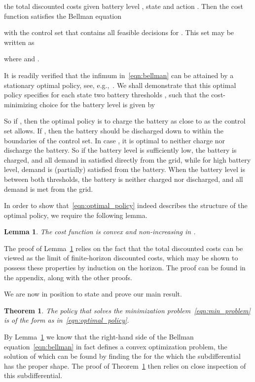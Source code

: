 \documentclass[journal]{IEEEtran}
\newcommand\1{\mathbf{1}}
\newtheorem{lemma}{Lemma}
\newtheorem{theorem}{Theorem}
\begin{document}
the total discounted costs given battery level , state  and action . Then the cost function satisfies the Bellman equation

with  the control set that contains all feasible decisions for . This set may be written as

where  and .

It is readily verified that the infimum in~\eqref{eqn:bellman} can be attained by a stationary optimal policy, see, e.g.,~\cite[Proposition 4.4]{BS96}. We shall demonstrate that this optimal policy specifies for each state  two battery thresholds ,  such that the cost-minimizing choice for the battery level  is given by

So if , then the optimal policy is to charge the battery as close to  as the control set allows. If , then the battery should be discharged down to  within the boundaries of the control set. In case , it is optimal to neither charge nor discharge the battery. So if the battery level is sufficiently low, the battery is charged, and all demand in satisfied directly from the grid, while for high battery level, demand is (partially) satisfied from the battery. When the battery level is between both thresholds, the battery is neither charged nor discharged, and all demand is met from the grid.

In order to show that~\eqref{eqn:optimal_policy} indeed describes the structure of the optimal policy, we require the following lemma.

\begin{lemma}\label{lem:cost_properties}
The cost function  is convex and non-increasing in .
\end{lemma}

The proof of Lemma~\ref{lem:cost_properties} relies on the fact that the total discounted costs can be viewed as the limit of finite-horizon discounted costs, which may be shown to possess these properties by induction on the horizon. The proof can be found in the appendix, along with the other proofs.


We are now in position to state and prove our main result.
\begin{theorem}\label{thm:optimal}
The policy that solves the minimization problem~\eqref{eqn:min_problem} is of the form   as in~\eqref{eqn:optimal_policy}.
\end{theorem}

By Lemma~\ref{lem:cost_properties} we know that the right-hand side of the Bellman equation~\eqref{eqn:bellman} in fact defines a convex optimization problem, the solution of which can be found by finding the  for the which the subdifferential  has the proper shape. The proof of Theorem~\ref{thm:optimal} then relies on close inspection of this subdifferential.
\end{document}
